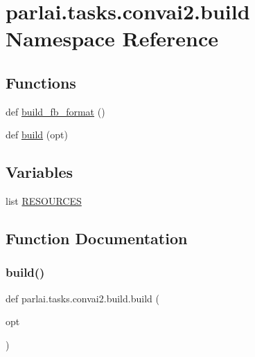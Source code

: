 \hypertarget{namespaceparlai_1_1tasks_1_1convai2_1_1build}{}\section{parlai.\+tasks.\+convai2.\+build Namespace Reference}
\label{namespaceparlai_1_1tasks_1_1convai2_1_1build}
\subsection*{Functions}
\begin{DoxyCompactItemize}
\item 
def \hyperlink{namespaceparlai_1_1tasks_1_1convai2_1_1build_aac893ef8d5159621bc7086097270f7c1}{build\+\_\+fb\+\_\+format} ()
\item 
def \hyperlink{namespaceparlai_1_1tasks_1_1convai2_1_1build_a2faeed65bdc0f4793f8a1f8cb840ec74}{build} (opt)
\end{DoxyCompactItemize}
\subsection*{Variables}
\begin{DoxyCompactItemize}
\item 
list \hyperlink{namespaceparlai_1_1tasks_1_1convai2_1_1build_a45995413b2766f076c1e1759a89009a6}{R\+E\+S\+O\+U\+R\+C\+ES}
\end{DoxyCompactItemize}


\subsection{Function Documentation}
\mbox{\label{namespaceparlai_1_1tasks_1_1convai2_1_1build_a2faeed65bdc0f4793f8a1f8cb840ec74}} 
\subsubsection{\texorpdfstring{build()}{build()}}
{\footnotesize\ttfamily def parlai.\+tasks.\+convai2.\+build.\+build (\begin{DoxyParamCaption}\item[{}]{opt }\end{DoxyParamCaption})}



